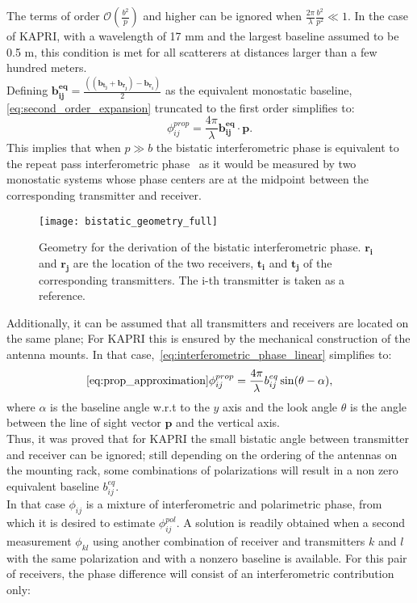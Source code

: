 The terms of order  $\mathcal{O}(\frac{b^2}{p})$ and higher can be ignored when $\frac{2\pi}{\lambda}\frac{b^2}{p^2} \ll 1$. In the case of KAPRI, with a wavelength of 17 mm and the largest baseline assumed to be 0.5 m, this condition is met for all scatterers at distances larger than a few hundred meters.\\
Defining $\mathbf{b_{ij}^{eq}} = \frac{((\mathbf{b_{t_j}} + \mathbf{b_{r_j}}) - \mathbf{b_{r_i}})}{2}$ as the equivalent monostatic baseline, \autoref{eq:second_order_expansion} truncated to the first order simplifies to:
\begin{equation}\label{eq:interferometric_phase_linear}
	\phi_{ij}^{prop} = \frac{4\pi}{\lambda}\mathbf{b_{ij}^{eq}}\cdot \mathbf{p}.
\end{equation}
This implies that when $p \gg b$ the bistatic interferometric phase is equivalent to the repeat pass interferometric phase~\cite{Rosen2000} as it would be measured by two monostatic systems whose phase centers are at the midpoint between the corresponding transmitter and receiver. 
\begin{figure}[ht]
	\centering
	\texttt{[image: bistatic\_geometry\_full]}
	\label{fig:bistatic_geometry}
	\caption{Geometry for the derivation of the bistatic interferometric phase. $\mathbf{r_i}$ and $\mathbf{r_j}$ are the location of the two receivers,  $\mathbf{t_i}$ and $\mathbf{t_j}$  of the corresponding transmitters. The i-th transmitter is taken as a reference.}
\end{figure}
Additionally, it can be assumed that all transmitters and receivers are located on the same plane; For KAPRI this is ensured by the mechanical construction of the antenna mounts. In that case,~\autoref{eq:interferometric_phase_linear} simplifies to:
\begin{equation}\autoref{eq:prop_approximation}
		\phi_{ij}^{prop} = \frac{4\pi}{\lambda} b_{ij}^{eq} \sin(\theta - \alpha),
\end{equation}
where $\alpha$ is the baseline angle w.r.t to the $y$ axis and the look angle $\theta$ is the angle between the line of sight vector $\mathbf{p}$ and the vertical axis.\\
Thus, it was proved that for KAPRI the small bistatic angle between transmitter and receiver can be ignored; still depending on the ordering of the antennas on the mounting rack, some combinations of polarizations will result in a non zero equivalent baseline $b_{ij}^{eq}$.\\
In that case $\phi_{ij}$ is a mixture of interferometric and polarimetric phase, from which it is desired to estimate  $\phi_{ij}^{pol}$. A solution is readily obtained when a second measurement $\phi_{kl}$ using another combination of receiver and transmitters $k$ and $l$ with the same polarization and with a nonzero baseline is available. For this pair of receivers, the phase difference will consist of an interferometric contribution only:
